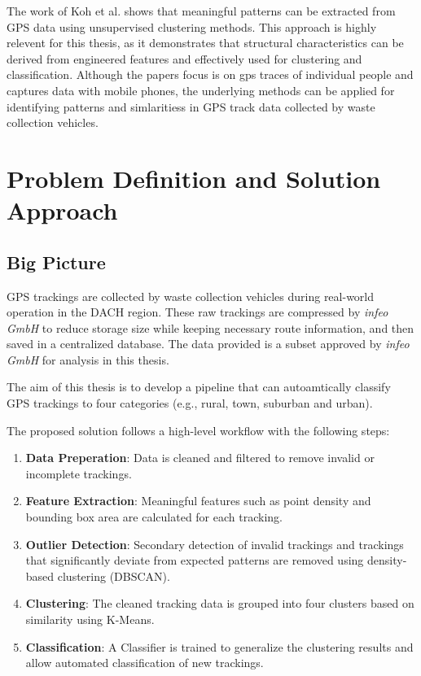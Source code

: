 \documentclass[a4paper,12pt,twoside]{scrreprt}
\begin{document}
The work of Koh et al. shows that meaningful patterns can be extracted from GPS
data using unsupervised clustering methods. This approach is highly relevent
for this thesis,
as it demonstrates that structural characteristics can be derived from
engineered features
and effectively used for clustering and classification. Although the papers
focus is on
gps traces of individual people and captures data with mobile phones, the
underlying methods can
be applied for identifying patterns and simlaritiess in GPS track data
collected by
waste collection vehicles.

\chapter{Problem Definition and Solution Approach}

\section{Big Picture}

GPS trackings are collected by waste collection vehicles during real-world
operation in the DACH region.
These raw trackings are compressed by \textit{infeo GmbH} to reduce storage
size while
keeping necessary route information, and then saved in a centralized database.
The data provided is a subset approved by \textit{infeo GmbH} for analysis in
this thesis.

The aim of this thesis is to develop a pipeline that can autoamtically classify
GPS trackings to four categories (e.g., rural, town, suburban and urban).

The proposed solution follows a high-level workflow with the following steps:

\begin{enumerate}
  \item \textbf{Data Preperation}: Data is cleaned and filtered to remove
        invalid or incomplete trackings.
  \item \textbf{Feature Extraction}: Meaningful features such as point density
        and bounding box area are calculated for each tracking.
  \item \textbf{Outlier Detection}: Secondary detection of invalid trackings
        and trackings that significantly deviate from expected patterns are
        removed
        using density-based clustering (DBSCAN).
  \item \textbf{Clustering}: The cleaned tracking data is grouped into four
        clusters based on similarity using K-Means.
  \item \textbf{Classification}: A Classifier is trained to generalize the
        clustering results and allow automated classification of new trackings.
\end{enumerate}
\end{document}
